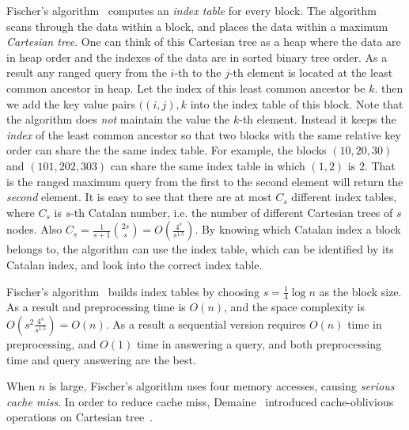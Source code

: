 Fischer's algorithm~\cite{Fischer2006TheoreticalAP} computes an {\em
  index table} for every block.  The algorithm scans through the data
within a block, and places the data within a maximum {\em Cartesian
  tree}.  One can think of this Cartesian tree as a heap where the
data are in heap order and the indexes of the data are in sorted
binary tree order.  As a result any ranged query from the $i$-th to
the $j$-th element is located at the least common ancestor in heap.
Let the index of this least common ancestor be $k$. then we add the
key value pairs $((i, j), k$ into the index table of this block.  Note
that the algorithm does {\em not} maintain the value the $k$-th
element.  Instead it keeps the {\em index} of the least common
ancestor so that two blocks with the same relative key order can share
the the same index table.  For example, the blocks $(10, 20, 30)$ and
$(101, 202, 303)$ can share the same index table in which $(1, 2)$ is
$2$.  That is the ranged maximum query from the first to the second
element will return the {\em second} element.  It is easy to see that
there are at most $C_s$ different index tables, where $C_s$ is $s$-th
Catalan number, i.e. the number of different Cartesian trees of $s$
nodes.  Also $C_s = \frac{1}{s+1}\binom{2s}{s} =
O(\frac{4^s}{s^{1.5}})$.  By knowing which Catalan index a block
belongs to, the algorithm can use the index table, which can be
identified by its Catalan index, and look into the correct index
table.

Fischer's algorithm~\cite{Fischer2006TheoreticalAP} builds index
tables by choosing $s = \frac{1}{4} \log n$ as the block size.  As a
result and preprocessing time is $O(n)$, and the space complexity is
$O(s^2 \frac{4^s}{s^{1.5}}) = O(n)$.  As a result a sequential version
requires $O(n)$ time in preprocessing, and $O(1)$ time in answering a
query, and both preprocessing time and query answering are the best.


When $n$ is large, Fischer's algorithm uses four memory accesses,
causing {\em serious cache miss}.  In order to reduce cache miss,
Demaine~\cite{Demaine2009OnCT} introduced cache-oblivious operations
on Cartesian tree~\cite{Vuillemin1980AUL}.



